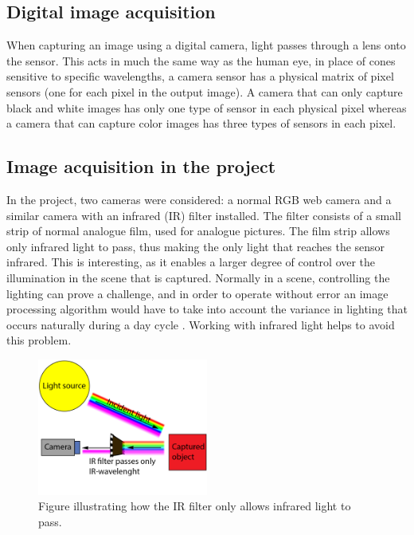 \subsection{Digital image acquisition}
When capturing an image using a digital camera, light passes through a lens onto the sensor. This acts in much the same way as the human eye, in place of cones sensitive to specific wavelengths, a camera sensor has a physical matrix of pixel sensors (one for each pixel in the output image). A camera that can only capture black and white images has only one type of sensor in each physical pixel whereas a camera that can capture color images has three types of sensors in each pixel\citep{ip_book}.



\subsection{Image acquisition in the project}
In the project, two cameras were considered: a normal RGB web camera and a similar camera with an infrared (IR) filter installed. The filter consists of a small strip of normal analogue film, used for analogue pictures. The film strip allows only infrared light to pass, thus making the only light that reaches the sensor infrared. This is interesting, as it enables a larger degree of control over the illumination in the scene that is captured. Normally in a scene, controlling the lighting can prove a challenge, and in order to operate without error an image processing algorithm would have to take into account the variance in lighting that occurs naturally during a day cycle \citep{ip_book}. Working with infrared light helps to avoid this problem.


\begin{figure}[htbp] 
\centering 
\includegraphics[width=0.5\textwidth]{Pictures/Theory/IR_filter.png} 
\caption{Figure illustrating how the IR filter only allows infrared light to pass.} 
\label{fig:ir_filter} 
\end{figure}

